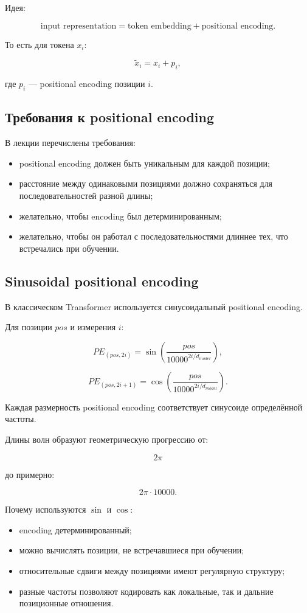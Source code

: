 \documentclass[a4paper,12pt]{article}
\begin{document}
Идея:

\[
\text{input representation}
=
\text{token embedding}
+
\text{positional encoding}.
\]

То есть для токена \(x_i\):

\[
\tilde{x}_i = x_i + p_i,
\]

где \(p_i\) --- positional encoding позиции \(i\).

\subsection{Требования к positional encoding}

В лекции перечислены требования:

\begin{itemize}
    \item positional encoding должен быть уникальным для каждой позиции;
    \item расстояние между одинаковыми позициями должно сохраняться для последовательностей разной длины;
    \item желательно, чтобы encoding был детерминированным;
    \item желательно, чтобы он работал с последовательностями длиннее тех, что встречались при обучении.
\end{itemize}

\subsection{Sinusoidal positional encoding}

В классическом Transformer используется синусоидальный positional encoding.

Для позиции \(pos\) и измерения \(i\):

\[
PE_{(pos, 2i)}
=
\sin
\left(
\frac{pos}{10000^{2i/d_{model}}}
\right),
\]

\[
PE_{(pos, 2i+1)}
=
\cos
\left(
\frac{pos}{10000^{2i/d_{model}}}
\right).
\]

Каждая размерность positional encoding соответствует синусоиде определённой частоты.

Длины волн образуют геометрическую прогрессию от:

\[
2\pi
\]

до примерно:

\[
2\pi \cdot 10000.
\]

Почему используются \(\sin\) и \(\cos\):

\begin{itemize}
    \item encoding детерминированный;
    \item можно вычислять позиции, не встречавшиеся при обучении;
    \item относительные сдвиги между позициями имеют регулярную структуру;
    \item разные частоты позволяют кодировать как локальные, так и дальние позиционные отношения.
\end{itemize}
\end{document}
